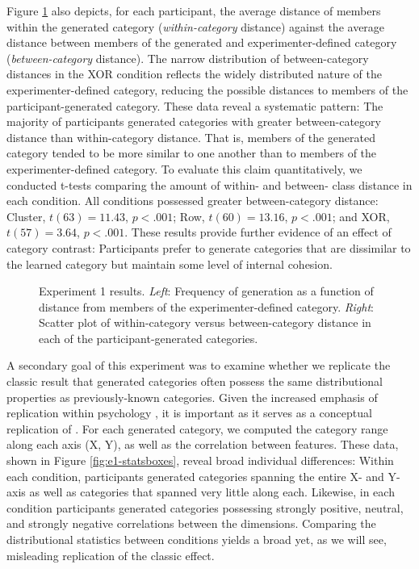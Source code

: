 \documentclass[12pt]{article}
\newcommand\inputpgf[2]{{
\let\pgfimageWithoutPath\pgfimage
\renewcommand{\pgfimage}[2][]{\pgfimageWithoutPath[##1]{#1/##2}}

}}
\begin{document}
\begin{flushleft}
Figure \ref{fig:e1-distanceplots} also depicts, for each participant, the
average distance of members within the generated category ({\em within-category}
distance) against the average distance between members of the generated and
experimenter-defined category ({\em between-category} distance). The narrow
distribution of between-category distances in the XOR condition reflects the
widely distributed nature of the experimenter-defined category, reducing the
possible distances to members of the participant-generated category. These data
reveal a systematic pattern: The majority of participants generated categories
with greater between-category distance than within-category distance. That is,
members of the generated category tended to be more similar to one another than
to members of the experimenter-defined category. To evaluate this claim
quantitatively, we conducted t-tests comparing the amount of within- and
between- class distance in each condition. All conditions possessed greater
between-category distance: Cluster, $t(63) = 11.43$, $p < .001$; Row, $t(60) =
13.16$, $p < .001$; and XOR, $t(57) = 3.64$, $p < .001$. These results provide
further evidence of an effect of category contrast: Participants prefer to
generate categories that are dissimilar to the learned category but maintain
some level of internal cohesion.

\begin{figure}
    \begin{center} \inputpgf{figs/}{e1-distanceplots.pgf}
    \caption{Experiment 1 results. {\em Left}: Frequency of generation as a
function of distance from members of the experimenter-defined category. {\em
Right}: Scatter plot of within-category versus between-category distance in each
of the participant-generated categories.}
    \label{fig:e1-distanceplots}
    \end{center}
\end{figure}

A secondary goal of this experiment was to examine whether we replicate the
classic result that generated categories often possess the same distributional
properties as previously-known categories. Given the increased emphasis of replication within psychology \citep{zwaan2018making}, it is important as it serves as a conceptual replication of \citet{jern2013probabilistic}. For each generated category, we
computed the category range along each axis (X, Y), as well as the correlation
between features. These data, shown in Figure \ref{fig:e1-statsboxes}, reveal
broad individual differences: Within each condition, participants generated
categories spanning the entire X- and Y- axis as well as categories that spanned
very little along each. Likewise, in each condition participants generated
categories possessing strongly positive, neutral, and strongly negative
correlations between the dimensions. Comparing the distributional statistics
between conditions yields a broad yet, as we will see, misleading replication of
the classic effect.


\end{flushleft}
\end{document}
